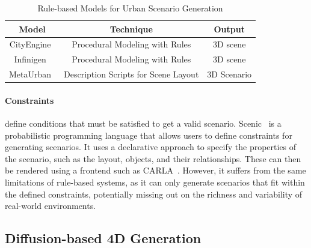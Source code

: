 \documentclass{article}
\begin{document}
\begin{table}[ht]
\centering
    \begin{tabular}{|c|c|c|}
    \hline
    \textbf{Model} & \textbf{Technique} & \textbf{Output} \\ \hline
    CityEngine~\cite{parish2001procedural} & Procedural Modeling with Rules & 3D scene \\ \hline
    Infinigen~\cite{raistrick2023infinite} & Procedural Modeling with Rules & 3D scene \\ \hline
    MetaUrban~\cite{wu2024metaurban} & Description Scripts for Scene Layout & 3D Scenario \\ \hline    
    \end{tabular}
\caption{Rule-based Models for Urban Scenario Generation}
\label{tab:rule_based_models}
\end{table}

\paragraph{Constraints} define conditions that must be satisfied to get a valid scenario. Scenic~\cite{fremont2019scenic} is a probabilistic programming language that allows users to define constraints for generating scenarios. It uses a declarative approach to specify the properties of the scenario, such as the layout, objects, and their relationships. These can then be rendered using a frontend such as CARLA~\cite{dosovitskiy2017carla}. However, it suffers from the same limitations of rule-based systems, as it can only generate scenarios that fit within the defined constraints, potentially missing out on the richness and variability of real-world environments.

\subsection{Diffusion-based 4D Generation}
\end{document}
